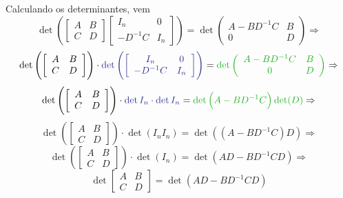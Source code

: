 \documentclass[11pt,a4paper]{article}
\begin{document}
{Calculando os determinantes, vem
\[
\det \left( \left[ \begin{array}{cc} A & B \\ C & D \end{array} \right] \left[ \begin{array}{cc} I_n & 0 \\ -D^{-1}C & I_n \end{array} \right] \right) = \det \left( \begin{array}{cc} A - BD^{-1}C & B \\ 0 & D \end{array} \right) \Rightarrow
\]
\[
\det \left( \left[ \begin{array}{cc} A & B \\ C & D \end{array} \right] \right) \cdot \textcolor{Blue}{ \det \left(\left[ \begin{array}{cc} I_n & 0 \\ -D^{-1}C & I_n \end{array} \right] \right) } = \textcolor{Verde}{ \det \left( \begin{array}{cc} A - BD^{-1}C & B \\ 0 & D \end{array} \right)} \Rightarrow
\]
\[
\det \left( \left[ \begin{array}{cc} A & B \\ C & D \end{array} \right] \right) \cdot \textcolor{Blue}{ \det I_n  \cdot \det I_n} = \textcolor{Verde}{ \det \left(A - BD^{-1}C \right) \det (D)} \Rightarrow
\]
\[
\det \left( \left[ \begin{array}{cc} A & B \\ C & D \end{array} \right] \right) \cdot \det (I_n I_n) =  \det \left((A - BD^{-1}C)D \right) \Rightarrow \]\[\det \left( \left[ \begin{array}{cc} A & B \\ C & D \end{array} \right] \right) \cdot \det (I_n) =  \det (AD - BD^{-1}CD) \Rightarrow 
\]
\[
\boxed{\det \left[ \begin{array}{cc} A & B \\ C & D \end{array} \right] =  \det \left(AD - BD^{-1}CD \right)}
\]
    }
\end{document}
